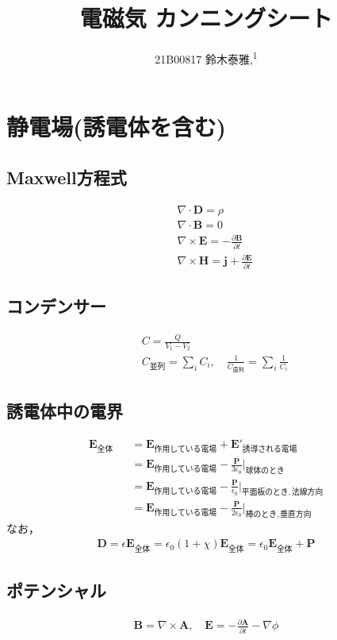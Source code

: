 \documentclass[12pt,dvipdfmx]{jsarticle}
\newcommand\authormark[1]{\textsuperscript{#1}}
\begin{document}
\title{電磁気 カンニングシート}

\author{21B00817 鈴木泰雅,\authormark{1}}
\section*{\Large{静電場(誘電体を含む)}}
\subsection*{Maxwell方程式}
\begin{eqnarray}
  &&\nabla\cdot \bm{D} = \rho\\
  &&\nabla\cdot\bm{B}=0\\
  &&\nabla\times \bm{E} = -\frac{\partial \bm{B}}{\partial t}\\
  &&\nabla\times \bm{H} = \bm{j} + \frac{\partial\bm{E}}{\partial t}
\end{eqnarray}
\subsection*{コンデンサー}
\begin{eqnarray}
  &&C= \frac{Q}{V_1-V_2}\\
  &&C_{並列} = \sum_i C_i,\quad \frac{1}{C_{直列}} = \sum_i \frac{1}{C_i}
\end{eqnarray}
\subsection*{誘電体中の電界}
\begin{eqnarray}
  \bm{E}_{全体} &&= \bm{E}_{作用している電場} + \bm{E}'_{誘導される電場}\\
  &&=\bm{E}_{作用している電場} - \frac{\bm{P}}{3\epsilon_0}|_{球体のとき}\\
  &&=\bm{E}_{作用している電場} - \frac{\bm{P}}{\epsilon_0}|_{平面板のとき, 法線方向}\\
  &&=\bm{E}_{作用している電場} - \frac{\bm{P}}{2\epsilon_0}|_{棒のとき, 垂直方向}
\end{eqnarray}
なお，
\begin{eqnarray}
  \bm{D} = \epsilon \bm{E}_{全体}= \epsilon_0\left(1+\chi  \right)\bm{E}_{全体} = \epsilon_0 \bm{E}_{全体} + \bm{P}  
\end{eqnarray}
\subsection*{ポテンシャル}
\begin{eqnarray}
  \bm{B} = \nabla\times \bm{A},\quad \bm{E} = -\frac{\partial\bm{A}}{\partial t} -\nabla\phi
\end{eqnarray}
\end{document}
